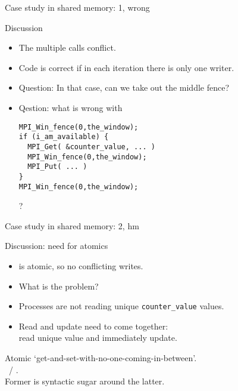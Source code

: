 \begin{mpithree}
\begin{numberedframe}{Case study in shared memory: 1, wrong}
  \label{sl:fetchput}
\end{numberedframe}

\begin{numberedframe}{Discussion}
  \begin{itemize}
  \item The multiple  calls conflict.
  \item Code is correct if in each iteration there is only one writer.
  \item Question: In that case, can we take out the middle fence?
  \item Qestion: what is wrong with
\begin{lstlisting}
MPI_Win_fence(0,the_window);
if (i_am_available) {
  MPI_Get( &counter_value, ... )
  MPI_Win_fence(0,the_window);
  MPI_Put( ... )      
}
MPI_Win_fence(0,the_window);
\end{lstlisting}
?
  \end{itemize}
\end{numberedframe}

\begin{numberedframe}{Case study in shared memory: 2, hm}
  \label{sl:fetchacc}
\end{numberedframe}

\begin{numberedframe}{Discussion: need for atomics}
  \label{sl:fetchop}
  \begin{itemize}
  \item {} is atomic, so no conflicting writes.
  \item What is the problem?
  \item Processes are not reading unique \lstinline+counter_value+ values.
  \item Read and update need to come together:\\
    read unique value and immediately update.
  \end{itemize}
  Atomic `get-and-set-with-no-one-coming-in-between'.\\
  ~/ .\\
  Former is syntactic sugar around the latter.
\end{numberedframe}


\end{mpithree}
